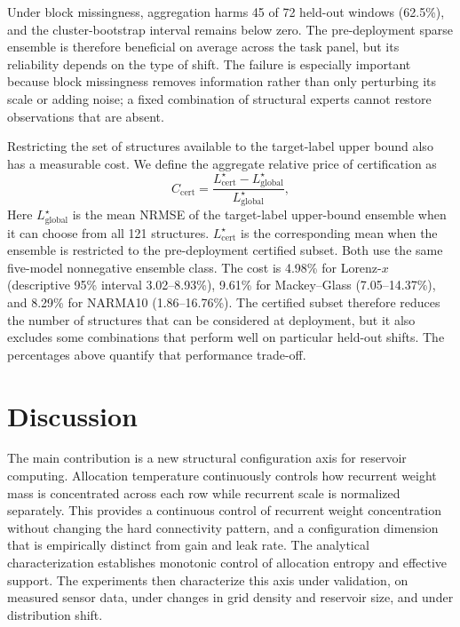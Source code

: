 \documentclass[preprint,12pt,authoryear]{elsarticle}
\begin{document}
Under block missingness, aggregation harms 45 of 72 held-out windows (62.5\%), and the cluster-bootstrap interval remains below zero. The pre-deployment sparse ensemble is therefore beneficial on average across the task panel, but its reliability depends on the type of shift. The failure is especially important because block missingness removes information rather than only perturbing its scale or adding noise; a fixed combination of structural experts cannot restore observations that are absent.

Restricting the set of structures available to the target-label upper bound also has a measurable cost. We define the aggregate relative price of certification as
\begin{equation}
  C_{\mathrm{cert}}
  =\frac{L^{\star}_{\mathrm{cert}}-L^{\star}_{\mathrm{global}}}
  {L^{\star}_{\mathrm{global}}},
  \label{eq:certification_cost}
\end{equation}
Here $L^{\star}_{\mathrm{global}}$ is the mean NRMSE of the target-label upper-bound ensemble when it can choose from all 121 structures. $L^{\star}_{\mathrm{cert}}$ is the corresponding mean when the ensemble is restricted to the pre-deployment certified subset. Both use the same five-model nonnegative ensemble class. The cost is 4.98\% for Lorenz-$x$ (descriptive 95\% interval 3.02--8.93\%), 9.61\% for Mackey--Glass (7.05--14.37\%), and 8.29\% for NARMA10 (1.86--16.76\%). The certified subset therefore reduces the number of structures that can be considered at deployment, but it also excludes some combinations that perform well on particular held-out shifts. The percentages above quantify that performance trade-off.

\section{Discussion}
\label{sec:discussion}

The main contribution is a new structural configuration axis for reservoir computing. Allocation temperature continuously controls how recurrent weight mass is concentrated across each row while recurrent scale is normalized separately. This provides a continuous control of recurrent weight concentration without changing the hard connectivity pattern, and a configuration dimension that is empirically distinct from gain and leak rate. The analytical characterization establishes monotonic control of allocation entropy and effective support. The experiments then characterize this axis under validation, on measured sensor data, under changes in grid density and reservoir size, and under distribution shift.
\end{document}
